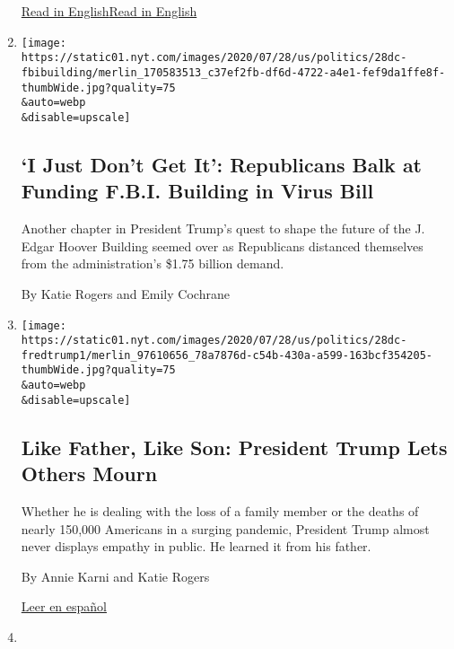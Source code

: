 \begin{enumerate}
  \href{https://www.nytimes.com/2020/07/28/us/politics/donald-fred-trump.html}{Read
  in
  English}\href{https://www.nytimes.com/2020/07/28/us/politics/donald-fred-trump.html}{Read
  in English}
\item
  \href{/2020/07/28/us/politics/republicans-trump-fbi-building-virus-relief-bill.html}{}

  \texttt{[image: https://static01.nyt.com/images/2020/07/28/us/politics/28dc-fbibuilding/merlin\_170583513\_c37ef2fb-df6d-4722-a4e1-fef9da1ffe8f-thumbWide.jpg?quality=75\\\&auto=webp\\\&disable=upscale]}

  \hypertarget{i-just-dont-get-it-republicans-balk-at-funding-fbi-building-in-virus-bill}{%
  \subsection{`I Just Don't Get It': Republicans Balk at Funding F.B.I.
  Building in Virus
  Bill}\label{i-just-dont-get-it-republicans-balk-at-funding-fbi-building-in-virus-bill}}

  Another chapter in President Trump's quest to shape the future of the
  J. Edgar Hoover Building seemed over as Republicans distanced
  themselves from the administration's \$1.75 billion demand.

  By Katie Rogers and Emily Cochrane
\item
  \href{/2020/07/28/us/politics/donald-fred-trump.html}{}

  \texttt{[image: https://static01.nyt.com/images/2020/07/28/us/politics/28dc-fredtrump1/merlin\_97610656\_78a7876d-c54b-430a-a599-163bcf354205-thumbWide.jpg?quality=75\\\&auto=webp\\\&disable=upscale]}

  \hypertarget{like-father-like-son-president-trump-lets-others-mourn}{%
  \subsection{Like Father, Like Son: President Trump Lets Others
  Mourn}\label{like-father-like-son-president-trump-lets-others-mourn}}

  Whether he is dealing with the loss of a family member or the deaths
  of nearly 150,000 Americans in a surging pandemic, President Trump
  almost never displays empathy in public. He learned it from his
  father.

  By Annie Karni and Katie Rogers

  \href{https://www.nytimes.com/es/2020/07/31/espanol/estados-unidos/fred-trump-donald-trump.html}{Leer
  en español}
\item
  \href{/2020/07/27/us/politics/trump-yankees-fauci.html}{}


\end{enumerate}
